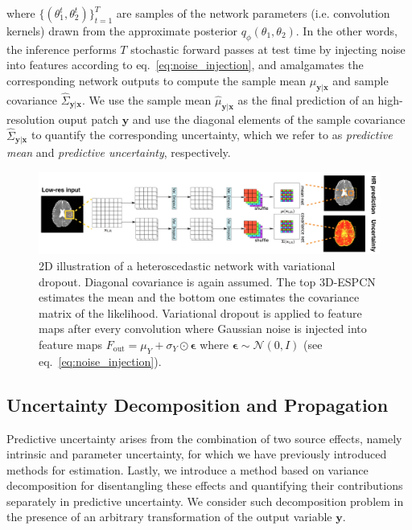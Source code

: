 where $\{(\theta^t_1,\theta^t_2)\}_{t=1}^T$ are samples of the network parameters (i.e. convolution kernels) drawn from the approximate posterior $ q_{\phi}(\theta_1, \theta_{2})$. In the other words, the inference performs $T$ stochastic forward passes at test time by injecting noise into features according to eq.~\ref{eq:noise_injection}, and amalgamates the corresponding network outputs to compute the sample mean $\hat{\mu}_{\mathbf{y}|\mathbf{x}}$ and sample covariance $\hat{\Sigma}_{\mathbf{y}|\mathbf{x}}$. We use the sample mean $\hat{\mu}_{\mathbf{y}|\mathbf{x}}$  as the final prediction of an high-resolution ouput patch $\mathbf{y}$ and use the diagonal elements of the sample covariance $\hat{\Sigma}_{\mathbf{y}|\mathbf{x}}$ to quantify the corresponding uncertainty, which we refer to as \textit{predictive mean} and \textit{predictive uncertainty}, respectively. 



\begin{figure}
	\includegraphics[width=\linewidth]{chapter_3/figures/fig_2_2.png}
	\centering	
	\small 
	\vspace{-8mm}
	\caption{\footnotesize 2D illustration of a heteroscedastic network with variational dropout. Diagonal covariance is again assumed. The top 3D-ESPCN estimates the mean and the bottom one estimates the covariance matrix of the likelihood. Variational dropout is applied to feature maps after every convolution where Gaussian noise is injected into feature maps $F_{\text{out}} = \mu_{Y} +  \sigma_{Y} \odot \mathbf{\epsilon}$ where $\mathbf{\epsilon} \sim \mathcal{N}(0,I)$ (see eq.~\ref{eq:noise_injection}). } 
	\label{fig:heterovar}
\end{figure}

\subsection{Uncertainty Decomposition and Propagation} \label{sec:uncertainty_decom}
Predictive uncertainty arises from the combination of two source effects, namely intrinsic and parameter uncertainty, for which we have previously introduced methods for estimation. Lastly, we introduce a method based on variance decomposition for disentangling these effects and quantifying their contributions separately in predictive uncertainty. We consider such decomposition problem in the presence of an arbitrary transformation of the output variable $\mathbf{y}$. 

